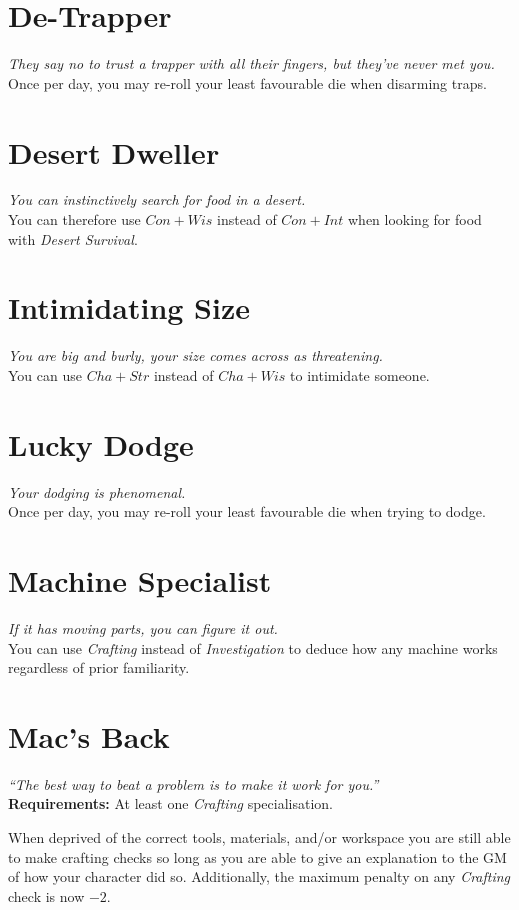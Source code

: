\section{De-Trapper}
\textit{They say no to trust a trapper with all their fingers, but they've never met you.}\\
Once per day, you may re-roll your least favourable die when disarming traps.

\section{Desert Dweller}
\textit{You can instinctively search for food in a desert.}\\
You can therefore use $Con + Wis$ instead of $Con + Int$ when looking for food with \textit{Desert Survival}.

\section{Intimidating Size}
\textit{You are big and burly, your size comes across as threatening.}\\
You can use $Cha + Str$ instead of $Cha + Wis$ to intimidate someone.

\section{Lucky Dodge}
\textit{Your dodging is phenomenal.}\\
Once per day, you may re-roll your least favourable die when trying to dodge.

\section{Machine Specialist}
\textit{If it has moving parts, you can figure it out.}\\
You can use \textit{Crafting} instead of \textit{Investigation} to deduce how any machine works regardless of prior familiarity.

\section{Mac's Back}
\textit{``The best way to beat a problem is to make it work for you.''}\\
\textbf{Requirements:} At least one \textit{Crafting} specialisation.

When deprived of the correct tools, materials, and/or workspace you are still able to make crafting checks so long as you are able to give an explanation to the GM of how your character did so.
Additionally, the maximum penalty on any \textit{Crafting} check is now $-2$.


